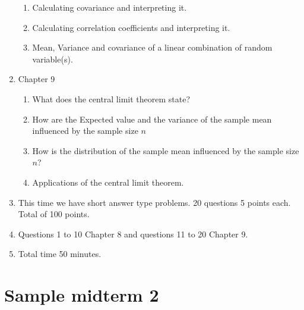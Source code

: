\documentclass{article}
\begin{document}
\begin{enumerate}
\begin{enumerate}
\item Calculating covariance and interpreting it.
\item Calculating correlation coefficients and interpreting it.
\item Mean, Variance and covariance of a linear combination of random variable(s).
\end{enumerate}
\item Chapter 9
\begin{enumerate}
\item What does the central limit theorem state?
\item How are the Expected value and the variance of the sample mean influenced by the sample size $n$
\item How is the distribution of the sample mean influenced by the sample size $n$?
\item Applications of the central limit theorem.
\end{enumerate}
\item This time we have short answer type problems. 20 questions 5 points each. Total of 100 points.
\item Questions 1 to 10 Chapter 8 and questions 11 to 20 Chapter 9.
\item Total time 50 minutes.
\end{enumerate}

\section{Sample midterm 2}
\end{document}
